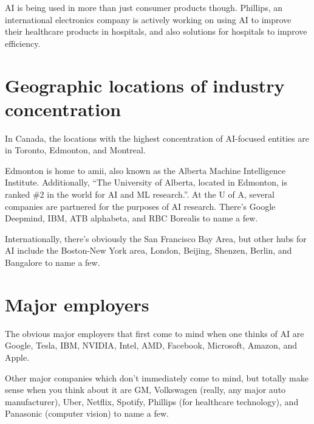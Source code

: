 \documentclass[letterpaper,12pt]{article}
\begin{document}
AI is being used in more than just consumer products though. Phillips,
an international electronics company is actively working on using
AI to improve their healthcare products in hospitals, and also 
solutions for hospitals to improve efficiency.




\section{Geographic locations of industry concentration}

In Canada, the locations with the highest concentration of AI-focused
entities are in Toronto, Edmonton, and Montreal.\cite{investincanada}

Edmonton is home to amii, also known as the Alberta Machine Intelligence Institute.
Additionally, ``The University of Alberta, located in Edmonton, is ranked \#2 in the world for AI and ML research.''\cite{investincanada}\cite{edmonton.ai}.
At the U of A, several companies are partnered for the purposes of AI research.
There's Google Deepmind, IBM, ATB alphabeta, and RBC Borealis to name a few.

Internationally, there's obviously the San Francisco Bay Area,
but other hubs for AI include
the Boston-New York area,
London,
Beijing,
Shenzen,
Berlin,
and Bangalore to name a few.\cite{aihubs}\cite{aihubsreview}

\section{Major employers}

The obvious major employers that first come to mind when one thinks of AI are
Google,
Tesla,
IBM,
NVIDIA, Intel, AMD,
Facebook,
Microsoft,
Amazon,
and
Apple.

Other major companies which don't immediately come to mind, but totally make sense when you think about it are
GM,
Volkswagen (really, any major auto manufacturer),
Uber,
Netflix,
Spotify,
Phillips (for healthcare technology),
and
Panasonic (computer vision) to name a few.\cite{surpriseai}
\end{document}
